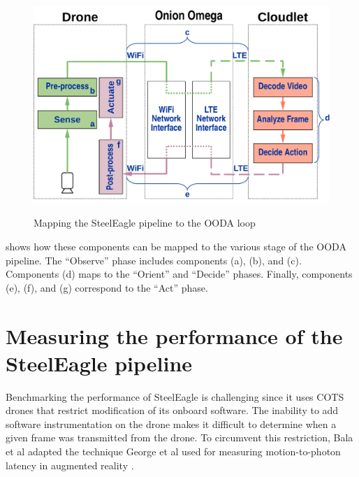 \begin{figure}[htbp]
\centering
\includegraphics[width = .6\textwidth]{figs/fig-ooda-loop.pdf}\\
\caption{Mapping the SteelEagle pipeline to the OODA loop}
\label{fig:ooda-mapping}
\end{figure}

 shows how these components can be mapped to the various
stage of the OODA pipeline. The ``Observe'' phase includes components (a), (b),
and (c). Components (d) maps to the ``Orient'' and ``Decide'' phases. Finally,
components (e), (f), and (g) correspond to the ``Act'' phase.

\section{Measuring the performance of the SteelEagle pipeline}
\label{sec:steeleagle-performance-measurement}

Benchmarking the performance of SteelEagle is challenging since it uses COTS
drones that restrict modification of its onboard software. The inability to add
software instrumentation on the drone makes it difficult to determine when a
given frame was transmitted from the drone. To circumvent this restriction,
Bala et al adapted the technique George et al used for measuring
motion-to-photon latency in augmented reality \cite{george20}.



